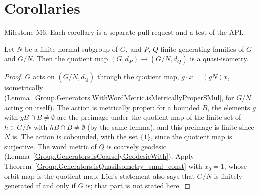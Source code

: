\chapter{Corollaries}
\label{chap:corollaries}

Milestone M6. Each corollary is a separate pull request and a test of the API.




\begin{corollary}
  \label{QuotientGroup.isQuasiIsometry_mk}
  Let $N$ be a finite normal subgroup of $G$, and $P$, $Q$ finite generating families of $G$ and
  $G/N$. Then the quotient map $(G, d_P) \to (G/N, d_Q)$ is a quasi-isometry.
\end{corollary}
\begin{proof}
  $G$ acts on $(G/N, d_Q)$ through the quotient map, $g \cdot x = (gN)x$, isometrically
  (Lemma~\ref{Group.Generators.WithWordMetric.isMetricallyProperSMul}, for $G/N$ acting on itself).
  The action is metrically proper: for a bounded $B$, the elements $g$ with $g B \cap B \ne
  \emptyset$ are the preimage under the quotient map of the finite set of $h \in G/N$ with $h B \cap
  B \ne \emptyset$ (by the same lemma), and this preimage is finite since $N$ is. The action is
  cobounded, with the set $\{1\}$, since the quotient map is surjective. The word metric of $Q$ is
  coarsely geodesic (Lemma~\ref{Group.Generators.isCoarselyGeodesicWith}). Apply
  Theorem~\ref{Group.Generators.isQuasiIsometry_smul_const} with $x_0 = 1$, whose orbit map is the
  quotient map. L\"oh's statement also says that $G/N$ is finitely generated if and only if $G$ is;
  that part is not stated here.
\end{proof}

